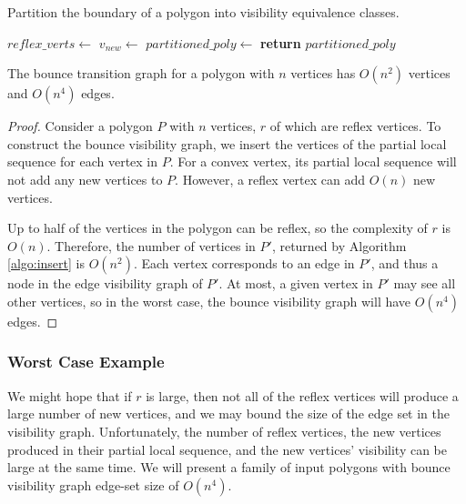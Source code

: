 \documentclass[]{svproc}  %
\begin{document}
\begin{algorithm}
\caption{Partition the boundary of a polygon into visibility
equivalence classes.}
\label{algo:insert}
\begin{algorithmic}
\State $reflex\_verts \gets$ 
     
        \State $v_{new} \gets$ 
    \EndFor
\EndFor
\State $partitioned\_poly \gets$ 
\State \textbf{return} $partitioned\_poly$
\EndProcedure
\end{algorithmic}
\end{algorithm}

\begin{proposition} The bounce transition graph for a polygon with $n$ vertices has 
$O(n^2)$ vertices and $O(n^4)$ edges.
\end{proposition}

\begin{proof}

Consider a polygon $P$ with $n$ vertices, $r$ of which are reflex vertices. To
construct the bounce visibility graph, we insert the vertices of the partial
local sequence for each vertex in $P$. For a convex vertex, its partial local sequence 
will not add any new vertices to $P$. However, a reflex vertex can add $O(n)$ new vertices. 

Up to half of the vertices in the polygon can be reflex, so the complexity of
$r$ is $O(n)$. Therefore, the number of vertices in $P'$, returned by Algorithm
\ref{algo:insert} is $O(n^2)$. Each vertex corresponds to an edge in $P'$, and
thus a node in the edge visibility graph of $P'$. At most, a given vertex in $P'$ may see all other vertices, so in the worst
case, the bounce visibility graph will have $O(n^4)$ edges.

\end{proof}

\subsubsection{Worst Case Example}

We might hope that if $r$ is large, then not all of the reflex vertices will
produce a large number of new vertices, and we may bound the size of the edge
set in the visibility graph. Unfortunately, the number of reflex
vertices, the new vertices produced in their partial local sequence, and the new
vertices' visibility can be large at the same time. We will present a family of
input polygons with bounce visibility graph edge-set size of $O(n^4)$.
\end{document}
